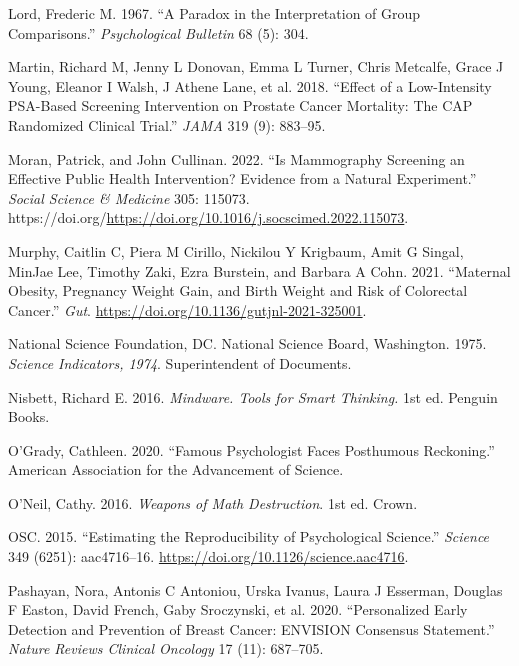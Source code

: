 \documentclass[
  10ptls,
  b5paper]{book}
\newlength{\cslhangindent}
\newlength{\cslentryspacingunit} %
\newenvironment{CSLReferences}[2] %
 {%
  \setlength{\parindent}{0pt}
  \ifodd #1
  \let\oldpar\par
  \def\par{\hangindent=\cslhangindent\oldpar}
  \fi
  \setlength{\parskip}{#2\cslentryspacingunit}
 }%
 {}
\begin{document}
\begin{CSLReferences}{1}{0}
\leavevmode{}%
Lord, Frederic M. 1967. {``A Paradox in the Interpretation of Group Comparisons.''} \emph{Psychological Bulletin} 68 (5): 304.

\leavevmode{}%
Martin, Richard M, Jenny L Donovan, Emma L Turner, Chris Metcalfe, Grace J Young, Eleanor I Walsh, J Athene Lane, et al. 2018. {``Effect of a Low-Intensity PSA-Based Screening Intervention on Prostate Cancer Mortality: The CAP Randomized Clinical Trial.''} \emph{JAMA} 319 (9): 883--95.

\leavevmode{}%
Moran, Patrick, and John Cullinan. 2022. {``Is Mammography Screening an Effective Public Health Intervention? Evidence from a Natural Experiment.''} \emph{Social Science \& Medicine} 305: 115073. https://doi.org/\url{https://doi.org/10.1016/j.socscimed.2022.115073}.

\leavevmode{}%
Murphy, Caitlin C, Piera M Cirillo, Nickilou Y Krigbaum, Amit G Singal, MinJae Lee, Timothy Zaki, Ezra Burstein, and Barbara A Cohn. 2021. {``Maternal Obesity, Pregnancy Weight Gain, and Birth Weight and Risk of Colorectal Cancer.''} \emph{Gut}. \url{https://doi.org/10.1136/gutjnl-2021-325001}.

\leavevmode{}%
National Science Foundation, DC. National Science Board, Washington. 1975. \emph{Science Indicators, 1974}. Superintendent of Documents.

\leavevmode{}%
Nisbett, Richard E. 2016. \emph{Mindware. Tools for Smart Thinking.} 1st ed. Penguin Books.

\leavevmode{}%
O'Grady, Cathleen. 2020. {``Famous Psychologist Faces Posthumous Reckoning.''} American Association for the Advancement of Science.

\leavevmode{}%
O'Neil, Cathy. 2016. \emph{Weapons of Math Destruction}. 1st ed. Crown.

\leavevmode{}%
OSC. 2015. {``Estimating the Reproducibility of Psychological Science.''} \emph{Science} 349 (6251): aac4716--16. \url{https://doi.org/10.1126/science.aac4716}.

\leavevmode{}%
Pashayan, Nora, Antonis C Antoniou, Urska Ivanus, Laura J Esserman, Douglas F Easton, David French, Gaby Sroczynski, et al. 2020. {``Personalized Early Detection and Prevention of Breast Cancer: ENVISION Consensus Statement.''} \emph{Nature Reviews Clinical Oncology} 17 (11): 687--705.


\end{CSLReferences}
\end{document}
